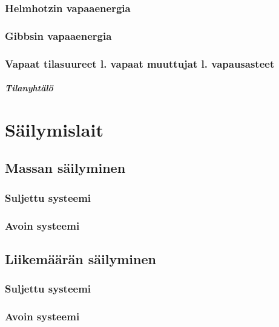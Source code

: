 \documentclass[12pt,a4paper,finnish]{book}
\begin{document}
\subsection{Helmhotzin vapaaenergia}

\subsection{Gibbsin vapaaenergia}

\subsection{Vapaat tilasuureet l. vapaat muuttujat l. vapausasteet}

\paragraph{Tilanyhtälö}

\chapter{Säilymislait} %

\section{Massan säilyminen}

\subsection{Suljettu systeemi}

\subsection{Avoin systeemi}

\section{Liikemäärän säilyminen}

\subsection{Suljettu systeemi}

\subsection{Avoin systeemi}
\end{document}
